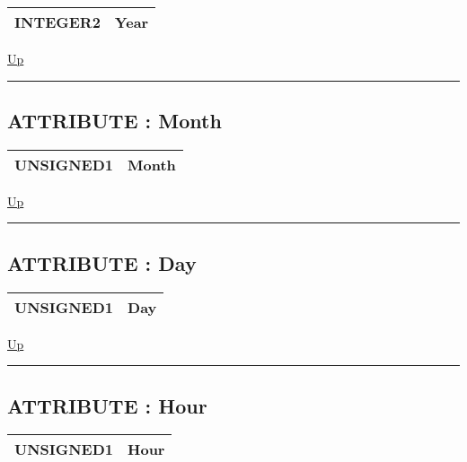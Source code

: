 {\renewcommand{\arraystretch}{1.5}
\begin{tabularx}{\textwidth}{|>{\raggedright\arraybackslash}l|X|}
\hline
\hspace{0pt}INTEGER2 & Year \\
\hline
\end{tabularx}
}

\hyperlink{ecldoc:date.secondstoparts}{Up}

\par


\rule{\textwidth}{0.4pt}
\subsection*{ATTRIBUTE : Month}
\hypertarget{ecldoc:date.secondstoparts.result.month}{}

{\renewcommand{\arraystretch}{1.5}
\begin{tabularx}{\textwidth}{|>{\raggedright\arraybackslash}l|X|}
\hline
\hspace{0pt}UNSIGNED1 & Month \\
\hline
\end{tabularx}
}

\hyperlink{ecldoc:date.secondstoparts}{Up}

\par


\rule{\textwidth}{0.4pt}
\subsection*{ATTRIBUTE : Day}
\hypertarget{ecldoc:date.secondstoparts.result.day}{}

{\renewcommand{\arraystretch}{1.5}
\begin{tabularx}{\textwidth}{|>{\raggedright\arraybackslash}l|X|}
\hline
\hspace{0pt}UNSIGNED1 & Day \\
\hline
\end{tabularx}
}

\hyperlink{ecldoc:date.secondstoparts}{Up}

\par


\rule{\textwidth}{0.4pt}
\subsection*{ATTRIBUTE : Hour}
\hypertarget{ecldoc:date.secondstoparts.result.hour}{}

{\renewcommand{\arraystretch}{1.5}
\begin{tabularx}{\textwidth}{|>{\raggedright\arraybackslash}l|X|}
\hline
\hspace{0pt}UNSIGNED1 & Hour \\
\hline
\end{tabularx}
}

